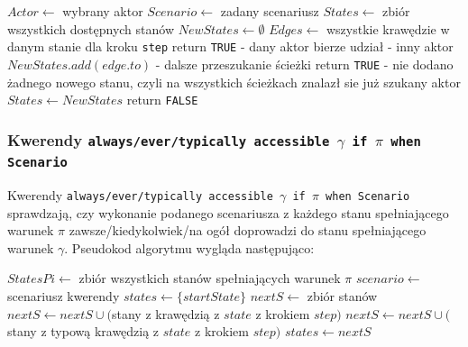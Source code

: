 \documentclass{article}
\begin{document}
\begin{algorithm}[H]
\begin{algorithmic}

\State $Actor \gets $ wybrany aktor
\State $Scenario \gets $ zadany scenariusz
\State $States \gets $ zbiór wszystkich dostępnych stanów
    \State $NewStates \gets \emptyset$
        \State $Edges \gets $ wszystkie krawędzie w danym stanie dla kroku \texttt{step}
        	        \State return \texttt{TRUE} - dany aktor bierze udział
        	    \EndIf
        	\Else - inny aktor
        	    \State $NewStates.add(edge.to)$ - dalsze przeszukanie ścieżki
            \EndIf
        \EndFor
    \EndFor
        \State return \texttt{TRUE} - nie dodano żadnego nowego stanu, czyli na wszystkich ścieżkach znalazł sie już szukany aktor
    \EndIf
    \State $States \gets NewStates$
\EndFor
\State return \texttt{FALSE}

\end{algorithmic}
\end{algorithm}
\newpage

\subsubsection{Kwerendy \texttt{always/ever/typically accessible $\gamma$ if $\pi$ when Scenario} }

Kwerendy \texttt{always/ever/typically accessible $\gamma$ if $\pi$ when Scenario} sprawdzają, czy wykonanie podanego scenariusza z każdego stanu spełniającego warunek $\pi$ zawsze/kiedykolwiek/na ogół doprowadzi do stanu spełniającego warunek $\gamma$. Pseudokod algorytmu wygląda następująco:

\begin{algorithm}[H]
\begin{algorithmic}
\State $StatesPi \gets $ zbiór wszystkich stanów spełniających warunek $\pi$ 
\State $scenario \gets $ scenariusz kwerendy
    \State $states \gets \{startState\}$
	    \State $nextS \gets $ zbiór stanów
		    	\State $nextS \gets nextS \cup ($stany z krawędzią z $state$ z krokiem $step)$
		    \Else
		        \State $nextS \gets nextS \cup ($stany z typową krawędzią z $state$ z krokiem $step)$
		    \EndIf
		\EndFor 
		\State $states \gets nextS$
	\EndFor
	    \State {}
	\EndIf
	 \State {}
	\EndIf
\EndFor
\State {}
\end{algorithmic}
\end{algorithm}
\newpage
\end{document}
